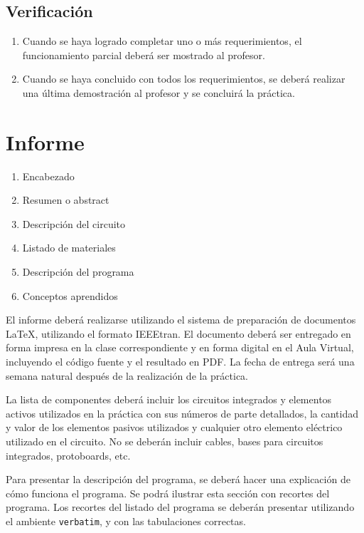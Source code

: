 \documentclass[12pt,letterpaper]{IEEEtran}
\begin{document}
\subsection{Verificación}

\begin{enumerate}[resume]
	\item Cuando se haya logrado completar uno o más requerimientos, el funcionamiento parcial deberá ser mostrado al profesor.
	\item Cuando se haya concluido con todos los requerimientos, se deberá realizar una última demostración al profesor y se concluirá la práctica.
\end{enumerate}


\section{Informe}

\begin{enumerate}
  \item Encabezado
  \item Resumen o abstract
  \item Descripción del circuito
  \item Listado de materiales
  \item Descripción del programa
  \item Conceptos aprendidos
\end{enumerate}

El informe deberá realizarse utilizando el sistema de preparación de documentos \LaTeX, utilizando el formato IEEEtran. El documento deberá ser entregado en forma impresa en la clase correspondiente y en forma digital en el Aula Virtual, incluyendo el código fuente y el resultado en PDF.  La fecha de entrega será una semana natural después de la realización de la práctica.

La lista de componentes deberá incluir los circuitos integrados y elementos activos utilizados en la práctica con sus números de parte detallados, la cantidad y valor de los elementos pasivos utilizados y cualquier otro elemento eléctrico utilizado en el circuito. No se deberán incluir cables, bases para circuitos integrados, protoboards, etc.


Para presentar la descripción del programa, se deberá hacer una explicación de cómo funciona el programa. Se podrá ilustrar esta sección con recortes del programa. Los recortes del listado del programa se deberán presentar utilizando el ambiente \texttt{verbatim}, y con las tabulaciones correctas. 
\end{document}
